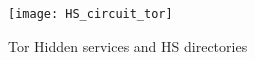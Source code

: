 \begin{figure}[h]
\centering\texttt{[image: HS\_circuit\_tor]}
\caption{Tor Hidden services and HS directories \cite{tor_slideshare}}
\label{fig:HS_circuit_tor} %
\end{figure}






